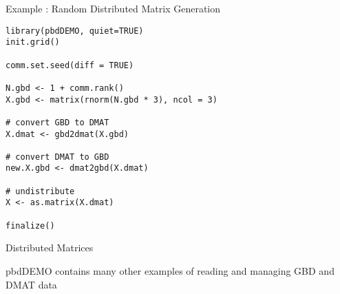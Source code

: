 \begin{frame}[fragile]
  \begin{exampleblock}{Example \countex:  Random Distributed Matrix Generation}\pause
\begin{lstlisting}[title=Convert between GBD and DMAT]
library(pbdDEMO, quiet=TRUE)
init.grid()

comm.set.seed(diff = TRUE)

N.gbd <- 1 + comm.rank()
X.gbd <- matrix(rnorm(N.gbd * 3), ncol = 3)

# convert GBD to DMAT
X.dmat <- gbd2dmat(X.gbd)

# convert DMAT to GBD
new.X.gbd <- dmat2gbd(X.dmat)

# undistribute
X <- as.matrix(X.dmat)

finalize()
\end{lstlisting}
  \end{exampleblock}
\end{frame}



\begin{frame}
  \begin{block}{Distributed Matrices}\pause
  \begin{center}
    pbdDEMO contains many other examples of reading and managing GBD and DMAT data
  \end{center}
  \end{block}
\end{frame}